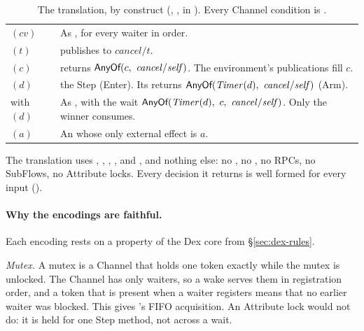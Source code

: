 \begin{table}[t]
\begin{tabularx}{\textwidth}{@{}P{3.5cm}L@{}}
$(\mathit{cv})$ & As , for every waiter in
  order. \\
$(t)$ &  publishes to $\mathit{cancel}/t$. \\
$(c)$ &  returns
  $\kw{AnyOf}(c,\ \mathit{cancel}/\mathit{self})$. The environment's
  publications fill $c$. \\
$(d)$ &  the  Step (Enter). Its 
  returns $\kw{AnyOf}(\mathit{Timer}(d),\ \mathit{cancel}/\mathit{self})$
  (Arm). \\
 with $(d)$ & As , with the wait
  $\kw{AnyOf}(\mathit{Timer}(d),\ c,\ \mathit{cancel}/\mathit{self})$. Only
  the winner consumes. \\
$(a)$ & An  whose only external effect is $a$. \\
\bottomrule
\end{tabularx}
\caption{The translation, by construct (,
,  in
). Every Channel condition is .}
\label{tab:mapping}
\end{table}

The translation uses , , ,
, and , and nothing else: no
, no , no RPCs, no SubFlows, no
Attribute locks. Every decision it returns is well formed for every input
().

\paragraph{Why the encodings are faithful.}
Each encoding rests on a property of the Dex core from
\S\ref{sec:dex-rules}.

\emph{Mutex.} A mutex is a Channel that holds one token exactly while the
mutex is unlocked. The Channel has only  waiters, so a wake
serves them in registration order, and a token that is present when a
waiter registers means that no earlier waiter was blocked. This gives
\Lang{}'s FIFO acquisition. An Attribute lock would not do: it is held for
one Step method, not across a wait.

